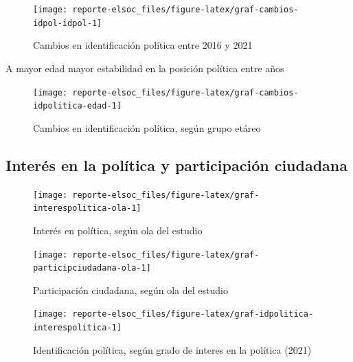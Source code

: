 \documentclass[
  12pt,
]{book}
\begin{document}
\begin{figure}

{\centering \texttt{[image: reporte-elsoc\_files/figure-latex/graf-cambios-idpol-idpol-1]} 

}

\caption{Cambios en identificación política entre 2016 y 2021}\label{fig:graf-cambios-idpol-idpol}
\end{figure}

A mayor edad mayor estabilidad en la posición política entre años

\begin{figure}

{\centering \texttt{[image: reporte-elsoc\_files/figure-latex/graf-cambios-idpolitica-edad-1]} 

}

\caption{Cambios en identificación política, según grupo etáreo}\label{fig:graf-cambios-idpolitica-edad}
\end{figure}

\hypertarget{interuxe9s-en-la-poluxedtica-y-participaciuxf3n-ciudadana}{%
\subsection{Interés en la política y participación ciudadana}\label{interuxe9s-en-la-poluxedtica-y-participaciuxf3n-ciudadana}}

\begin{figure}

{\centering \texttt{[image: reporte-elsoc\_files/figure-latex/graf-interespolitica-ola-1]} 

}

\caption{Interés en política, según ola del estudio}\label{fig:graf-interespolitica-ola}
\end{figure}

\begin{figure}

{\centering \texttt{[image: reporte-elsoc\_files/figure-latex/graf-participciudadana-ola-1]} 

}

\caption{Participación ciudadana, según ola del estudio}\label{fig:graf-participciudadana-ola}
\end{figure}

\begin{figure}

{\centering \texttt{[image: reporte-elsoc\_files/figure-latex/graf-idpolitica-interespolitica-1]} 

}

\caption{Identificación política, según grado de interes en la política (2021)}\label{fig:graf-idpolitica-interespolitica}
\end{figure}
\end{document}
